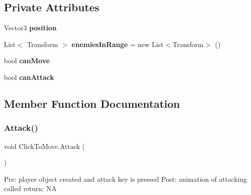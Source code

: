 \subsection*{Private Attributes}
\begin{DoxyCompactItemize}
\item 
\mbox{\label{class_click_to_move_afd98b037b9175c78885ad6a7815a11b8}} 
Vector3 {\bfseries position}
\item 
\mbox{\label{class_click_to_move_aa1b653d4efebd28d2a2b644e2bc5abb7}} 
List$<$ Transform $>$ {\bfseries enemies\+In\+Range} = new List$<$Transform$>$ ()
\item 
\mbox{\label{class_click_to_move_acad5001efecf12cd5a0e326bbab8b6c8}} 
bool {\bfseries can\+Move}
\item 
\mbox{\label{class_click_to_move_ae7968592257870641fce73765fda4c12}} 
bool {\bfseries can\+Attack}
\end{DoxyCompactItemize}


\subsection{Member Function Documentation}
\mbox{\label{class_click_to_move_a7a22f9529f61a4da097d950d65b5bcaa}} 
\subsubsection{\texorpdfstring{Attack()}{Attack()}}
{\footnotesize\ttfamily void Click\+To\+Move.\+Attack (\begin{DoxyParamCaption}{ }\end{DoxyParamCaption})\hspace{0.3cm}{\ttfamily [private]}}

Pre\+: player object created and attack key is pressed Post\+: animation of attacking called return\+: NA \mbox{\label{class_click_to_move_a9ec6685677f20e880a600762dd64d22a}} 
